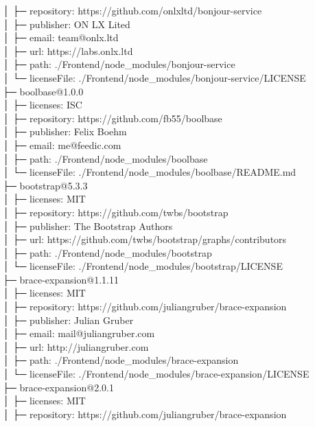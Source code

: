 \documentclass[
    paper=a4,
    twoside=false,
    parskip=half,
    listof=entryprefix,
    listof=totoc,
    index=totoc,
    bibliography=totoc,
    headsepline,
]{scrbook}
\begin{document}
    │  ├─ repository: https://github.com/onlxltd/bonjour-service\\
    │  ├─ publisher: ON LX Lited\\
    │  ├─ email: team@onlx.ltd\\
    │  ├─ url: https://labs.onlx.ltd\\
    │  ├─ path: ./Frontend/node\_modules/bonjour-service\\
    │  └─ licenseFile: ./Frontend/node\_modules/bonjour-service/LICENSE\\
    ├─ boolbase@1.0.0\\
    │  ├─ licenses: ISC\\
    │  ├─ repository: https://github.com/fb55/boolbase\\
    │  ├─ publisher: Felix Boehm\\
    │  ├─ email: me@feedic.com\\
    │  ├─ path: ./Frontend/node\_modules/boolbase\\
    │  └─ licenseFile: ./Frontend/node\_modules/boolbase/README.md\\
    ├─ bootstrap@5.3.3\\
    │  ├─ licenses: MIT\\
    │  ├─ repository: https://github.com/twbs/bootstrap\\
    │  ├─ publisher: The Bootstrap Authors\\
    │  ├─ url: https://github.com/twbs/bootstrap/graphs/contributors\\
    │  ├─ path: ./Frontend/node\_modules/bootstrap\\
    │  └─ licenseFile: ./Frontend/node\_modules/bootstrap/LICENSE\\
    ├─ brace-expansion@1.1.11\\
    │  ├─ licenses: MIT\\
    │  ├─ repository: https://github.com/juliangruber/brace-expansion\\
    │  ├─ publisher: Julian Gruber\\
    │  ├─ email: mail@juliangruber.com\\
    │  ├─ url: http://juliangruber.com\\
    │  ├─ path: ./Frontend/node\_modules/brace-expansion\\
    │  └─ licenseFile: ./Frontend/node\_modules/brace-expansion/LICENSE\\
    ├─ brace-expansion@2.0.1\\
    │  ├─ licenses: MIT\\
    │  ├─ repository: https://github.com/juliangruber/brace-expansion\\
\end{document}
